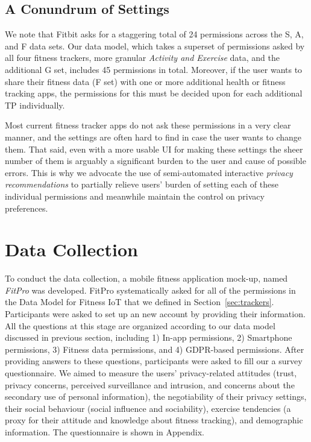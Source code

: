 \subsection{A Conundrum of Settings}

We note that Fitbit asks for a staggering total of 24 permissions across the S, A, and F data sets. Our data model, which takes a superset of permissions asked by all four fitness trackers, more granular \textit{Activity and Exercise} data, and the additional G set, includes 45 permissions in total. Moreover, if the user wants to share their fitness data (F set) with one or more additional health or fitness tracking apps, the permissions for this must be decided upon for each additional TP individually. 

Most current fitness tracker apps do not ask these permissions in a very clear manner, and the settings are often hard to find in case the user wants to change them. That said, even with a more usable UI for making these settings the sheer number of them is arguably a significant burden to the user and cause of possible errors. This is why we advocate the use of semi-automated interactive \emph{privacy recommendations} to partially relieve users' burden of setting each of these individual permissions and meanwhile maintain the control on privacy preferences.

\section{Data Collection}
To conduct the data collection, a mobile fitness application mock-up, named \textit{FitPro} was developed. FitPro systematically asked for all of the permissions in the Data Model for Fitness IoT that we defined in Section~\ref{sec:trackers}. Participants were asked to set up an new account by providing their information. All the questions at this stage are organized according to our data model discussed in previous section, including 1) In-app permissions, 2) Smartphone permissions, 3) Fitness data permissions, and 4) GDPR-based permissions. After providing answers to these questions, participants were asked to fill our a survey questionnaire. We aimed to measure the users' privacy-related attitudes (trust, privacy concerns, perceived surveillance and intrusion, and concerns about the secondary use of personal information), the negotiability of their privacy settings, their social behaviour (social influence and sociability), exercise tendencies (a proxy for their attitude and knowledge about fitness tracking), and demographic information. The questionnaire is shown in Appendix.

